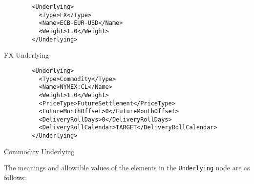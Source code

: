 \begin{listing}[H]
\begin{verbatim}
        <Underlying>
          <Type>FX</Type>
          <Name>ECB-EUR-USD</Name>
          <Weight>1.0</Weight>
        </Underlying>
\end{verbatim}
\caption{FX Underlying}
\label{lst:fxunderlying}
\end{listing}

\begin{listing}[H]
\begin{verbatim}
        <Underlying>
          <Type>Commodity</Type>
          <Name>NYMEX:CL</Name>
          <Weight>1.0</Weight>
          <PriceType>FutureSettlement</PriceType>
          <FutureMonthOffset>0</FutureMonthOffset>
          <DeliveryRollDays>0</DeliveryRollDays>
          <DeliveryRollCalendar>TARGET</DeliveryRollCalendar>
        </Underlying>
\end{verbatim}
\caption{Commodity Underlying}
\label{lst:communderlying}
\end{listing}


The meanings and allowable values of the elements in the \lstinline!Underlying! node are as follows:

